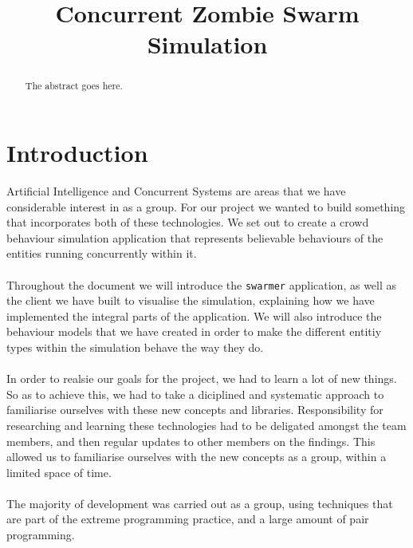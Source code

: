 \documentclass[10pt, a4paper, conference, compsocconf]{IEEEtran}
\begin{document}
\title{Concurrent Zombie Swarm Simulation}

\author{
\and
{}
\and
{}
}
\maketitle

\begin{abstract}
The abstract goes here.
\end{abstract}

\section{Introduction \label{intro}}
Artificial Intelligence and Concurrent Systems are areas that we have considerable interest in as a group. For our project we wanted to build something that incorporates both of these technologies. We set out to create a crowd behaviour simulation application that represents believable behaviours of the entities running concurrently within it.\\ %
\\
Throughout the document we will introduce the \verb+swarmer+ application, as well as the client we have built to visualise the simulation, explaining how we have implemented the integral parts of the application. We will also introduce the behaviour models that we have created in order to make the different entitiy types within the simulation behave the way they do.\\
\\%
In order to realsie our goals for the project, we had to learn a lot of new things. So as to achieve this, we had to take a diciplined and systematic approach to familiarise ourselves with these new concepts and libraries. Responsibility for researching and learning these technologies had to be deligated amongst the team members, and then regular updates to other members on the findings. This allowed us to familiarise ourselves with the new concepts as a group, within a limited space of time.\\
\\%
The majority of development was carried out as a group, using techniques that are part of the extreme programming practice, and a large amount of pair programming.\\
\\
\end{document}
